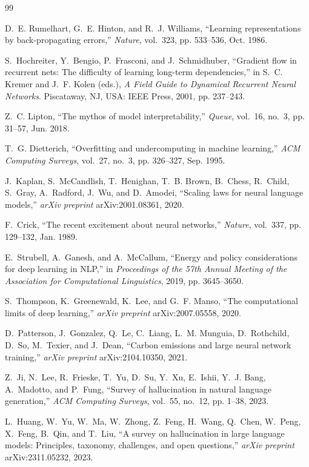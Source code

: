 \documentclass[12pt, a4paper]{article}
\begin{document}

\begin{thebibliography}{99}

D.~E. Rumelhart, G.~E. Hinton, and R.~J. Williams, ``Learning representations by back-propagating errors,'' \emph{Nature}, vol.~323, pp. 533--536, Oct. 1986.

S.~Hochreiter, Y.~Bengio, P.~Frasconi, and J.~Schmidhuber, ``Gradient flow in recurrent nets: The difficulty of learning long-term dependencies,'' in S.~C. Kremer and J.~F. Kolen (eds.), \emph{A Field Guide to Dynamical Recurrent Neural Networks}. Piscataway, NJ, USA: IEEE Press, 2001, pp. 237--243.

Z.~C. Lipton, ``The mythos of model interpretability,'' \emph{Queue}, vol.~16, no.~3, pp. 31--57, Jun. 2018.

T.~G. Dietterich, ``Overfitting and undercomputing in machine learning,'' \emph{ACM Computing Surveys}, vol.~27, no.~3, pp. 326--327, Sep. 1995.

J.~Kaplan, S.~McCandlish, T.~Henighan, T.~B. Brown, B.~Chess, R.~Child, S.~Gray, A.~Radford, J.~Wu, and D.~Amodei, ``Scaling laws for neural language models,'' \emph{arXiv preprint} arXiv:2001.08361, 2020.

F.~Crick, ``The recent excitement about neural networks,'' \emph{Nature}, vol.~337, pp. 129--132, Jan. 1989.

E.~Strubell, A.~Ganesh, and A.~McCallum, ``Energy and policy considerations for deep learning in NLP,'' in \emph{Proceedings of the 57th Annual Meeting of the Association for Computational Linguistics}, 2019, pp. 3645--3650.

S.~Thompson, K.~Greenewald, K.~Lee, and G.~F. Manso, ``The computational limits of deep learning,'' \emph{arXiv preprint} arXiv:2007.05558, 2020.

D.~Patterson, J.~Gonzalez, Q.~Le, C.~Liang, L.~M. Munguia, D.~Rothchild, D.~So, M.~Texier, and J.~Dean, ``Carbon emissions and large neural network training,'' \emph{arXiv preprint} arXiv:2104.10350, 2021.

Z.~Ji, N.~Lee, R.~Frieske, T.~Yu, D.~Su, Y.~Xu, E.~Ishii, Y.~J. Bang, A.~Madotto, and P.~Fung, ``Survey of hallucination in natural language generation,'' \emph{ACM Computing Surveys}, vol.~55, no.~12, pp. 1--38, 2023.

L.~Huang, W.~Yu, W.~Ma, W.~Zhong, Z.~Feng, H.~Wang, Q.~Chen, W.~Peng, X.~Feng, B.~Qin, and T.~Liu, ``A survey on hallucination in large language models: Principles, taxonomy, challenges, and open questions,'' \emph{arXiv preprint} arXiv:2311.05232, 2023.


\end{thebibliography}
\end{document}
